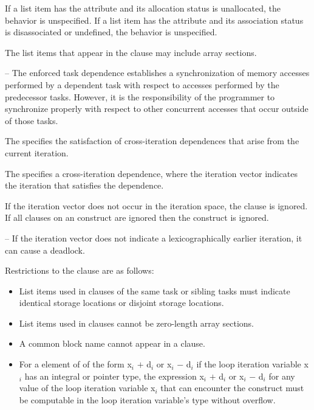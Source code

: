 {{{{\fortranspecificstart
If a list item has the  attribute and its allocation
status is unallocated, the behavior is unspecified. If a list item has
the  attribute and its association status is
disassociated or undefined, the behavior is unspecified.

The list items that appear in the  clause may include array sections.
\fortranspecificend

\notestart
\noteheader – The enforced task dependence establishes a synchronization of memory 
accesses performed by a dependent task with respect to accesses performed by the 
predecessor tasks. However, it is the responsibility of the programmer to synchronize properly with respect to other concurrent accesses that occur outside of those tasks.
\noteend

The   specifies the satisfaction of
cross-iteration dependences that arise from the current iteration.

The   specifies a cross-iteration dependence,
where the iteration vector  indicates the iteration that satisfies
the dependence.

If the iteration vector  does not occur in the iteration space,
the  clause is ignored.  If all  clauses on an
 construct are ignored then the construct is ignored.

\notestart
\noteheader – If the iteration vector  does not indicate a lexicographically earlier iteration, it can cause a deadlock.
\noteend

\restrictions
Restrictions to the  clause are as follows:

\begin{itemize}
\item List items used in  clauses of the same task or sibling tasks must indicate 
identical storage locations or disjoint storage locations. 

\item List items used in  clauses cannot be zero-length array sections. 

\fortranspecificstart
\item A common block name cannot appear in a  clause.
\fortranspecificend

\item For a  element of   of the form
x$_{i}$ $+$ d$_{i}$ or x$_{i}$ $-$ d$_{i}$ if the loop iteration variable
x$_{i}$ has an integral or pointer type, the expression x$_{i}$ $+$ d$_{i}$ or
x$_{i}$ $-$ d$_{i}$ for any value of the loop iteration variable x$_{i}$ that
can encounter the  construct must be computable in the
loop iteration variable's type without overflow.


\end{itemize}}}}}
